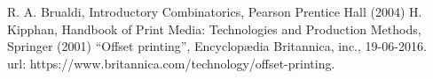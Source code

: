 
\begin{thebibliography}{}
%
%
R. A. Brualdi, Introductory Combinatorics, Pearson Prentice Hall (2004)
H. Kipphan, Handbook of Print Media: Technologies and Production Methods, Springer (2001)
``Offset printing'', Encyclop{\ae}dia Britannica, inc., 19-06-2016.\\ url: https://www.britannica.com/technology/offset-printing.

\end{thebibliography}



